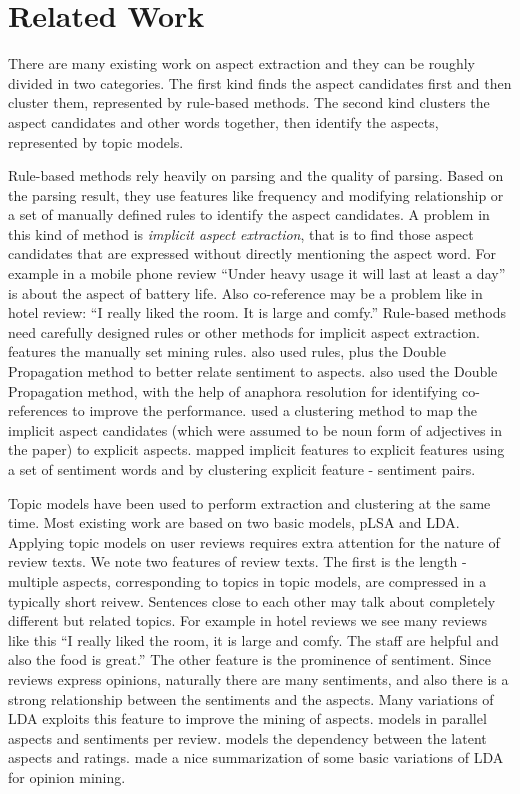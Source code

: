 \section{Related Work}

There are many existing work on aspect extraction and they can be roughly divided in two categories. The first kind finds the aspect candidates first and then cluster them, represented by rule-based methods. The second kind clusters the aspect candidates and other words together, then identify the aspects, represented by topic models.

Rule-based methods rely heavily on parsing and the quality of parsing. Based on the parsing result, they use features like frequency and modifying relationship or a set of manually defined rules to identify the aspect candidates. A problem in this kind of method is \emph{implicit aspect extraction}, that is to find those aspect candidates that are expressed without directly mentioning the aspect word. For example in a mobile phone review ``Under heavy usage it will last at least a day'' is about the aspect of battery life. Also co-reference may be a problem like in hotel review: ``I really liked the room. It is large and comfy.'' Rule-based methods need carefully designed rules or other methods for implicit aspect extraction.
\cite{poria2014rule} features the manually set mining rules. 
\cite{qiu2011opinion} also used rules, plus the Double Propagation method to better relate sentiment to aspects. 
\cite{gindl2013rule} also used the Double Propagation method, with the help of anaphora resolution for identifying co-references to improve the performance. 
\cite{su2008hidden} used a clustering method to map the implicit aspect candidates (which were assumed to be noun form of adjectives in the paper) to explicit aspects. 
\cite{zeng2013classification} mapped implicit features to explicit features using a set of sentiment words and by clustering explicit feature - sentiment pairs.

Topic models have been used to perform extraction and clustering at the same time. Most existing work are based on two basic models, pLSA\cite{hofmann1999probabilistic} and LDA\cite{blei2003latent}. Applying topic models on user reviews requires extra attention for the nature of review texts. We note two features of review texts. The first is the length - multiple aspects, corresponding to topics in topic models, are compressed in a typically short reivew. Sentences close to each other may talk about completely different but related topics. For example in hotel reviews we see many reviews like this ``I really liked the room, it is large and comfy. The staff are helpful and also the food is great.'' The other feature is the prominence of sentiment. Since reviews express opinions, naturally there are many sentiments, and also there is a strong relationship between the sentiments and the aspects. Many variations of LDA exploits this feature to improve the mining of aspects.
\cite{lakkaraju2011exploiting} models in parallel aspects and sentiments per review. 
\cite{lin2009joint} models the dependency between the latent aspects and ratings.
\cite{moghaddam2012design} made a nice summarization of some basic variations of LDA for opinion mining.

